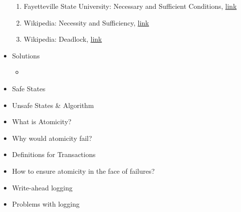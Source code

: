 \documentclass[12pt]{article}
\begin{document}
\begin{itemize}
    \begin{enumerate}[1)]
        \item Fayetteville State University: Necessary and Sufficient Conditions, \href{http://faculty.uncfsu.edu/jyoung/necessary_and_sufficient_conditions.htm}{link}
        \item Wikipedia: Necessity and Sufficiency, \href{https://en.wikipedia.org/wiki/Necessity_and_sufficiency}{link}
        \item Wikipedia: Deadlock, \href{https://en.wikipedia.org/wiki/Deadlock#Necessary_conditions}{link}
    \end{enumerate}
    \item Solutions
    \begin{itemize}
        \item
    \end{itemize}
    \item Safe States
    \item Unsafe States \& Algorithm
    \item What is Atomicity?
    \item Why would atomicity fail?
    \item Definitions for Transactions
    \item How to ensure atomicity in the face of failures?
    \item Write-ahead logging
    \item Problems with logging

\end{itemize}
\end{document}
